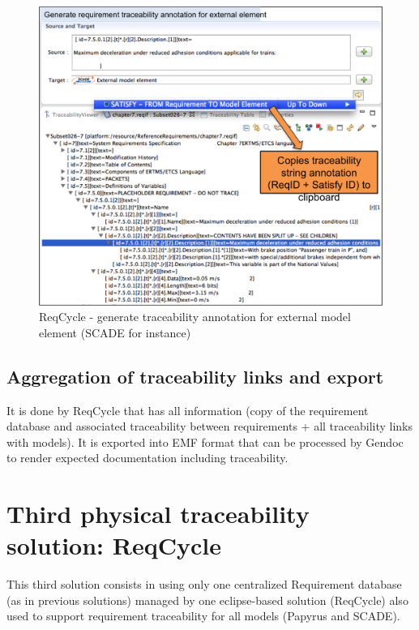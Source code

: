 \documentclass[11pt]{template/openetcs_report}
\begin{document}
\begin{figure}[tbp]
\centering
\includegraphics[width=0.9\linewidth]{images/ReqCycle_PrepareTraceLinkAnnotationForExternalElement.png}
\caption{\label{fig:ReqCycle_PrepareTraceLinkAnnotation}ReqCycle - generate traceability annotation for external model element (SCADE for instance)}
\end{figure}


\section{Aggregation of traceability links and export}
\label{sec-6-5}
It is done by ReqCycle that has all information (copy of the requirement database and associated traceability between requirements + all traceability links with models).
It is exported into EMF format that can be processed by Gendoc to render expected documentation including traceability.

\chapter{Third physical traceability solution: ReqCycle}
\label{sec-7}
This third solution consists in using only one centralized Requirement database (as in previous solutions) managed by one eclipse-based solution (ReqCycle) also used to support requirement traceability for all models (Papyrus and SCADE).
\end{document}
